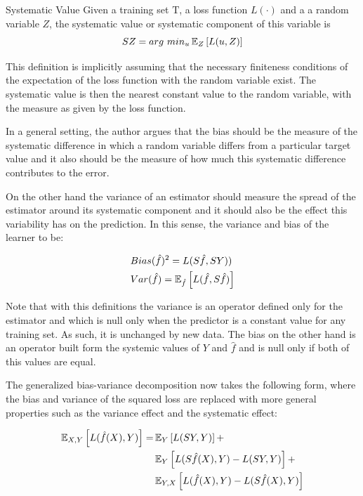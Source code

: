 \begin{definition}{Systematic Value}
Given a training set $\mathrm{T}$, a loss function $L(\cdot)$ and a a random variable $Z$, the systematic value or systematic component of this variable is
$$ SZ  =  arg \ min_u \operatorname{\mathbb{E}}_{Z} \left[ L(u,Z) \right]$$
\end{definition}

This definition is implicitly assuming that the necessary finiteness conditions of the expectation of the loss function with the random variable exist. The systematic value is then the nearest constant value to the random variable, with the measure as given by the loss function.


In a general setting, the author argues that the bias should be the measure of the systematic difference in which a random variable differs from a particular target value and it also should be the measure of how much this systematic difference contributes to the error.

On the other hand the variance of an estimator should measure the spread of the estimator around its systematic component and it should also be the effect this variability has on the prediction. In this sense, the variance and bias of the learner to be:

\begin{equation}
\begin{split}
& Bias(\hat{f})^2 = L(S\hat{f},SY)) \\
& Var(\hat{f}) = \operatorname{\mathbb{E}}_{\hat{f}} \left[  L(\hat{f}  , S\hat{f}) \right]
\end{split}
\end{equation}

Note that with this definitions the variance is an operator defined only for the estimator and which is null only when the predictor is a constant value for any training set. As such, it is unchanged by new data. The bias on the other hand is an operator built form the systemic values of $Y$ and $\hat{f}$ and is null only if both of this values are equal.


The generalized bias-variance decomposition now takes the following form, where the bias and variance of the squared loss are replaced with more general properties such as the variance effect and the systematic effect:

\begin{equation}
\begin{split}
\operatorname{\mathbb{E}}_{X,Y} \left[ L(\hat{f}(X),Y )\right] = &  \operatorname{\mathbb{E}}_{Y} \left[ L(SY,Y )\right] + \\
  &  \operatorname{\mathbb{E}}_{Y} \left[ L(S\hat{f}(X),Y ) - L(SY,Y )\right] + \\
  &  \operatorname{\mathbb{E}}_{Y,X} \left[ L(\hat{f}(X),Y ) - L(S\hat{f}(X),Y )\right]
\end{split}
\end{equation}

